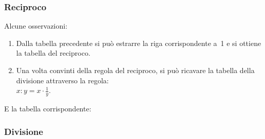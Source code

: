 \subsubsection{Reciproco}
\label{subsec:insnum_reciproco}

\begin{multicols}{2}
Alcune osservazioni:
\begin{enumerate} [noitemsep]
 \item Dalla tabella precedente si può estrarre la riga corrispondente a~1
e si ottiene la tabella del reciproco.
 \item Una volta convinti della regola del reciproco, si può ricavare la 
tabella della divisione attraverso la 
regola:\\
\(x : y = x \cdot \frac{1}{y}\).
\end{enumerate}
E la tabella corrispondente:
\begin{center}
\renewcommand{\arraystretch}{.0}
\end{center}
\end{multicols}

\subsubsection{Divisione}
\label{subsec:insnum_divisione}

